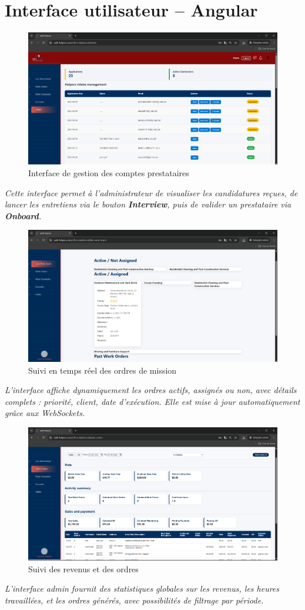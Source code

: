 \section*{Interface utilisateur – Angular}

\begin{figure}[H]
\centering
\includegraphics[width=0.85\linewidth]{figures/suivi prestataire.png}
\caption{Interface de gestion des comptes prestataires}
\end{figure}
\textit{Cette interface permet à l’administrateur de visualiser les candidatures reçues, de lancer les entretiens via le bouton \textbf{Interview}, puis de valider un prestataire via \textbf{Onboard}.}

\begin{figure}[H]
\centering
\includegraphics[width=0.85\linewidth]{figures/suivi orders.png}
\caption{Suivi en temps réel des ordres de mission}
\end{figure}
\textit{L’interface affiche dynamiquement les ordres actifs, assignés ou non, avec détails complets : priorité, client, date d’exécution. Elle est mise à jour automatiquement grâce aux WebSockets.}

\begin{figure}[H]
\centering
\includegraphics[width=0.85\linewidth]{figures/suivi revenue.png}
\caption{Suivi des revenus et des ordres}
\end{figure}
\textit{L’interface admin fournit des statistiques globales sur les revenus, les heures travaillées, et les ordres générés, avec possibilités de filtrage par période.}
